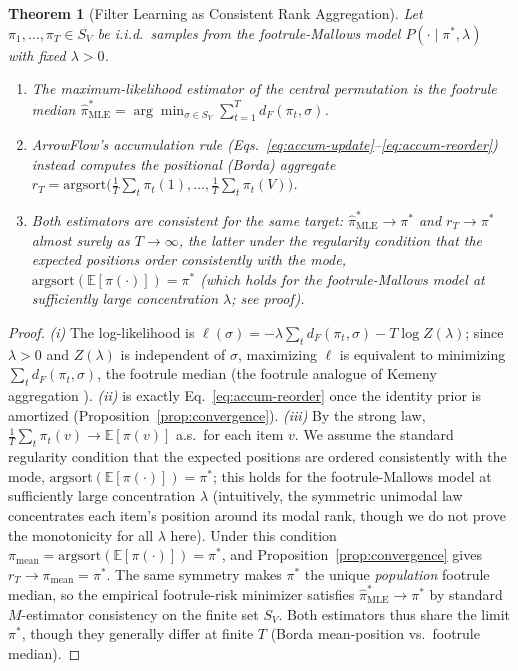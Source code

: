 \documentclass[12pt]{article}
\newcommand{\E}{\mathbb{E}}
\newcommand{\argsort}{\mathrm{argsort}}
\newtheorem{theorem}{Theorem}
\begin{document}
\begin{theorem}[Filter Learning as Consistent Rank Aggregation]
\label{thm:mle-filter}
Let $\pi_1, \dots, \pi_T \in S_V$ be i.i.d.\ samples from the footrule-Mallows model $P(\cdot \mid \pi^*, \lambda)$ with fixed $\lambda > 0$.
\begin{enumerate}[label=(\roman*)]
\item The maximum-likelihood estimator of the central permutation is the \emph{footrule median}
$\hat{\pi}^*_{\mathrm{MLE}} = \arg\min_{\sigma \in S_V} \sum_{t=1}^{T} d_F(\pi_t, \sigma)$.
\item ArrowFlow's accumulation rule (Eqs.~\ref{eq:accum-update}--\ref{eq:accum-reorder}) instead computes the \emph{positional} (Borda) aggregate
$r_T = \argsort\!\bigl(\tfrac1T\sum_t \pi_t(1), \dots, \tfrac1T\sum_t \pi_t(V)\bigr)$.
\item Both estimators are consistent for the same target: $\hat{\pi}^*_{\mathrm{MLE}} \to \pi^*$ and $r_T \to \pi^*$ almost surely as $T \to \infty$, the latter under the regularity condition that the expected positions order consistently with the mode, $\argsort(\E[\pi(\cdot)]) = \pi^*$ (which holds for the footrule-Mallows model at sufficiently large concentration $\lambda$; see proof).
\end{enumerate}
\end{theorem}

\begin{proof}
\emph{(i)} The log-likelihood is $\ell(\sigma) = -\lambda \sum_t d_F(\pi_t, \sigma) - T\log Z(\lambda)$; since $\lambda > 0$ and $Z(\lambda)$ is independent of $\sigma$, maximizing $\ell$ is equivalent to minimizing $\sum_t d_F(\pi_t, \sigma)$, the footrule median (the footrule analogue of Kemeny aggregation \citep{dwork2001rank}).
\emph{(ii)} is exactly Eq.~\eqref{eq:accum-reorder} once the identity prior is amortized (Proposition~\ref{prop:convergence}).
\emph{(iii)} By the strong law, $\tfrac1T\sum_t \pi_t(v) \to \E[\pi(v)]$ a.s.\ for each item $v$. We assume the standard regularity condition that the expected positions are ordered consistently with the mode, $\argsort(\E[\pi(\cdot)]) = \pi^*$; this holds for the footrule-Mallows model at sufficiently large concentration $\lambda$ (intuitively, the symmetric unimodal law concentrates each item's position around its modal rank, though we do not prove the monotonicity for all $\lambda$ here). Under this condition $\pi_{\mathrm{mean}} = \argsort(\E[\pi(\cdot)]) = \pi^*$, and Proposition~\ref{prop:convergence} gives $r_T \to \pi_{\mathrm{mean}} = \pi^*$. The same symmetry makes $\pi^*$ the unique \emph{population} footrule median, so the empirical footrule-risk minimizer satisfies $\hat{\pi}^*_{\mathrm{MLE}} \to \pi^*$ by standard $M$-estimator consistency on the finite set $S_V$. Both estimators thus share the limit $\pi^*$, though they generally differ at finite $T$ (Borda mean-position vs.\ footrule median).
\end{proof}
\end{document}
